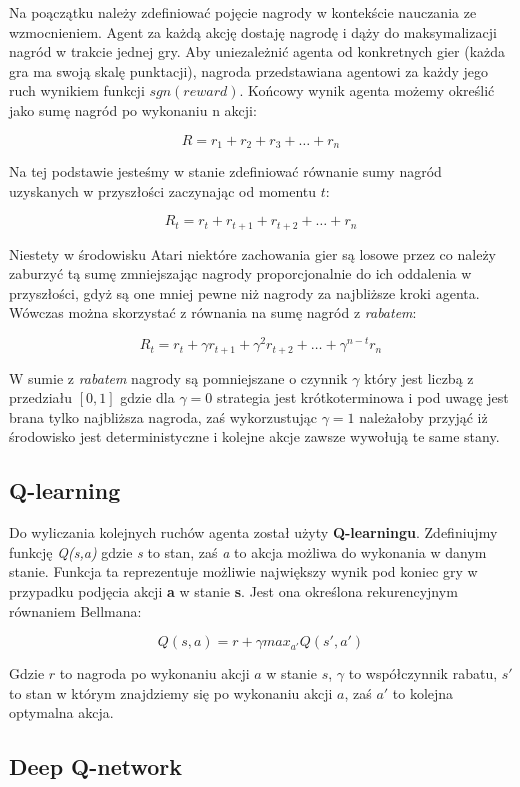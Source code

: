\documentclass[12pt]{article}
\begin{document}
Na poączątku należy zdefiniować pojęcie nagrody w kontekście nauczania ze wzmocnieniem. Agent za każdą akcję dostaję nagrodę i dąży do maksymalizacji nagród w trakcie jednej gry. Aby uniezależnić agenta od konkretnych gier (każda gra ma swoją skalę punktacji), nagroda przedstawiana agentowi za każdy jego ruch wynikiem funkcji $sgn(reward)$. Końcowy wynik agenta możemy określić jako sumę nagród po wykonaniu n akcji:

$$R=r_1 + r_2 + r_3 + \dots + r_n$$

Na tej podstawie jesteśmy w stanie zdefiniować równanie sumy nagród uzyskanych w przyszłości zaczynając od momentu $t$:

$$R_t=r_t + r_{t+1}+ r_{t+2} + \dots + r_n$$

Niestety w środowisku Atari niektóre zachowania gier są losowe przez co należy zaburzyć tą sumę zmniejszając nagrody proporcjonalnie do ich oddalenia w przyszłości, gdyż są one mniej pewne niż nagrody za najbliższe kroki agenta. Wówczas można skorzystać z równania na sumę nagród z \textit{rabatem}:

$$R_t=r_t + \gamma r_{t+1}+  \gamma^2 r_{t+2} + \dots + \gamma^{n-t}r_n$$

W sumie z \textit{rabatem} nagrody są pomniejszane o czynnik $\gamma$ który jest liczbą z przedziału $[0,1]$ gdzie dla $\gamma =0$ strategia jest krótkoterminowa i pod uwagę jest brana tylko najbliższa nagroda, zaś wykorzustując $\gamma =1$ należałoby przyjąć iż środowisko jest deterministyczne i kolejne akcje zawsze wywołują te same stany.

\subsection{Q-learning}

Do wyliczania kolejnych ruchów agenta został użyty \textbf{Q-learningu}. Zdefiniujmy funkcję \textit{Q(s,a)} gdzie \textit{s} to stan, zaś \textit{a} to akcja możliwa do wykonania w danym stanie. Funkcja ta reprezentuje możliwie największy wynik pod koniec gry w przypadku podjęcia akcji \textbf{a} w stanie \textbf{s}. Jest ona określona rekurencyjnym równaniem Bellmana:

$$Q(s,a) =  r + \gamma max_{a'}Q(s',a')$$

Gdzie $r$ to nagroda po wykonaniu akcji $a$ w stanie $s$, $\gamma$ to współczynnik rabatu, $s'$ to stan w którym znajdziemy się po wykonaniu akcji $a$, zaś $a'$ to kolejna optymalna akcja.

\subsection{Deep Q-network}
\end{document}
